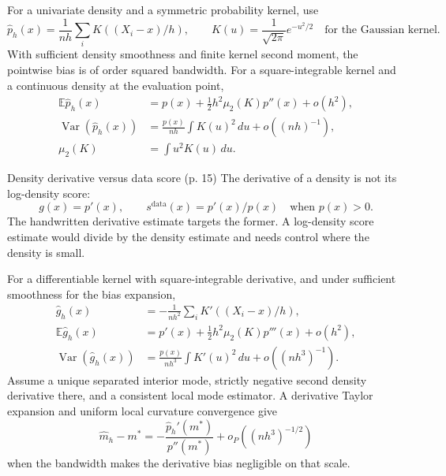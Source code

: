 \documentclass[12pt]{article}
\newcommand{\E}{\mathbb E}
\begin{document}
For a univariate density and a symmetric probability kernel, use
\begin{equation}
 \widehat p_h(x)=\frac1{nh}\sum_iK((X_i-x)/h),\qquad
 K(u)=\frac1{\sqrt{2\pi}}e^{-u^2/2}
 \quad\text{for the Gaussian kernel}.
\end{equation}
With sufficient density smoothness and finite kernel second moment,
the pointwise bias is of order squared bandwidth. For a square-integrable
kernel and a continuous density at the evaluation point,
\begin{align}
 \E\widehat p_h(x)&=p(x)+\tfrac12h^2\mu_2(K)p''(x)+o(h^2),\\
 \operatorname{Var}(\widehat p_h(x))
 &=\frac{p(x)}{nh}\int K(u)^2\,du+o((nh)^{-1}),\\
 \mu_2(K)&=\int u^2K(u)\,du.
\end{align}
\begin{correctionbox}{Density derivative versus data score (p. 15)}
The derivative of a density is not its log-density score:
\begin{equation}
 g(x)=p'(x),\qquad s^{\mathrm{data}}(x)=p'(x)/p(x)\quad\text{when }p(x)>0.
\end{equation}
The handwritten derivative estimate targets the former. A log-density
score estimate would divide by the density estimate and needs control
where the density is small.
\end{correctionbox}
For a differentiable kernel with square-integrable derivative, and under
sufficient smoothness for the bias expansion,
\begin{align}
 \widehat g_h(x)&=-\frac1{nh^2}\sum_iK'((X_i-x)/h),\\
 \E\widehat g_h(x)&=p'(x)+\tfrac12h^2\mu_2(K)p'''(x)+o(h^2),\\
 \operatorname{Var}(\widehat g_h(x))
 &=\frac{p(x)}{nh^3}\int K'(u)^2\,du+o((nh^3)^{-1}).
\end{align}
Assume a unique separated interior mode, strictly negative second density
derivative there, and a consistent local mode estimator. A derivative
Taylor expansion and uniform local curvature convergence give
\begin{equation}
 \widehat m_h-m^*=-\frac{\widehat p_h'(m^*)}{p''(m^*)}
 +o_P((nh^3)^{-1/2})
\end{equation}
when the bandwidth makes the derivative bias negligible on that scale.
\end{document}
